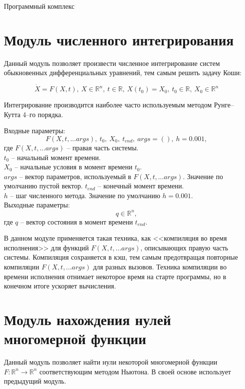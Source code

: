 \begin{chapter}{Программный комплекс}
\section{Модуль численного интегрирования}
Данный модуль позволяет произвести численное интегрирование систем обыкновенных
дифференциальных уравнений, тем самым решить задачу Коши:

$$
\dot{X} = F(X, t), \ X \in \mathbb{R}^n, \ t \in \mathbb{R}, \ X(t_0) = X_0, \ t_0 \in \mathbb{R}, \ X_0 \in \mathbb{R}^n
$$

Интегрирование производится наиболее часто используемым методом Рунге--Кутта 4--го порядка.

Входные параметры: $$F(X, t, ...args), \ t_0, \ X_0,  \ t_{end}, \ args = (), \ h=0.001,$$
где $F(X, t, ...args)$ -- правая часть системы. \\
$t_0$ -- начальный момент времени. \\
$X_0$ -- начальные условия в момент времени $t_0$. \\
$args$ -- вектор параметров, используемый в $F(X, t, ...args)$. Значение по умолчанию пустой вектор.
$t_{end}$ -- конечный момент времени. \\
$h$ -- шаг численного метода. Значение по умолчанию $h = 0.001$. \\
Выходные параметры: $$ q \in \mathbb{R}^n,$$
где $q$ -- вектор состояния в момент времени $t_{end}$.

В данном модуле применяется такая техника, как <<компиляция во время исполнения>>
для функций $F(X, t, ...args)$, описывающих правую часть системы. Компиляция сохраняется в кэш, тем
самым предотвращая повторные компиляции $F(X, t, ...args)$ для разных вызовов.
Техника компиляции во времени исполнения отнимает некоторое время на старте программы, но в конечном итоге ускоряет вычисления.

\section{Модуль нахождения нулей многомерной функции}
Данный модуль позволяет найти нули некоторой многомерной функции $F: \mathbb{R}^n \rightarrow \mathbb{R}^n$ соответствующим методом Ньютона.
В своей основе использует предыдущий модуль.


\end{chapter}
